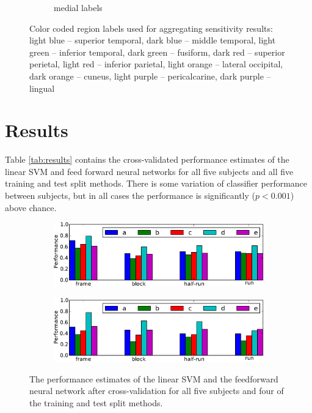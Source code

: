 \documentclass[preprint,5p,authoryear]{elsarticle}
\begin{document}
\begin{figure}
\begin{subfigure}{0.4\textwidth}
\caption{medial labels}
\label{fig:medial-labels}
\end{subfigure}
\caption{Color coded region labels used for aggregating sensitivity results: light blue -- superior temporal, dark blue -- middle temporal, light green -- inferior temporal, dark green -- fusiform, dark red -- superior perietal, light red -- inferior parietal, light orange -- lateral occipital, dark orange -- cuneus, light purple -- pericalcarine, dark purple -- lingual}
\end{figure}

\section{Results}
Table \ref{tab:results} contains the cross-validated performance estimates of the linear SVM and feed forward neural networks for all five subjects and all five training and test split methods.
There is some variation of classifier performance between subjects, but in all cases the performance is significantly ($p < 0.001$) above chance. 

\begin{figure}
\centering
\begin{subfigure}{0.8\textwidth}
\centering
\includegraphics[width=\textwidth]{figures/svm-performance-graph}
\caption{}
\label{fig:svm-performance-graph}
\end{subfigure}
\begin{subfigure}{0.8\textwidth}
\centering
\includegraphics[width=\textwidth]{figures/nn-performance-graph}
\caption{}
\label{fig:nn-performance-graph}
\end{subfigure}
\caption{The performance estimates of the  linear SVM and the  feedforward neural network after cross-validation for all five subjects and four of the training and test split methods. }
\end{figure}
\end{document}
